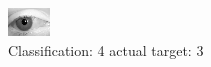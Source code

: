 \begin{figure}[h!]
\begin{center}
\includegraphics[width=0.60\columnwidth]{figures/ID2780_class_4_target_3.png}
\end{center}
\caption{ Classification: 4 actual target: 3}
\label{fig:ID2780_class_4_target_3}
\end{figure}
